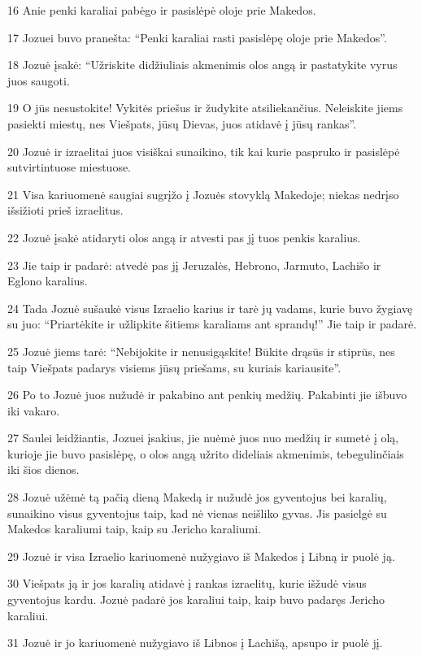 \par 16 Anie penki karaliai pabėgo ir pasislėpė oloje prie Makedos. 
\par 17 Jozuei buvo pranešta: “Penki karaliai rasti pasislėpę oloje prie Makedos”. 
\par 18 Jozuė įsakė: “Užriskite didžiuliais akmenimis olos angą ir pastatykite vyrus juos saugoti. 
\par 19 O jūs nesustokite! Vykitės priešus ir žudykite atsiliekančius. Neleiskite jiems pasiekti miestų, nes Viešpats, jūsų Dievas, juos atidavė į jūsų rankas”. 
\par 20 Jozuė ir izraelitai juos visiškai sunaikino, tik kai kurie paspruko ir pasislėpė sutvirtintuose miestuose. 
\par 21 Visa kariuomenė saugiai sugrįžo į Jozuės stovyklą Makedoje; niekas nedrįso išsižioti prieš izraelitus. 
\par 22 Jozuė įsakė atidaryti olos angą ir atvesti pas jį tuos penkis karalius. 
\par 23 Jie taip ir padarė: atvedė pas jį Jeruzalės, Hebrono, Jarmuto, Lachišo ir Eglono karalius. 
\par 24 Tada Jozuė sušaukė visus Izraelio karius ir tarė jų vadams, kurie buvo žygiavę su juo: “Priartėkite ir užlipkite šitiems karaliams ant sprandų!” Jie taip ir padarė. 
\par 25 Jozuė jiems tarė: “Nebijokite ir nenusigąskite! Būkite drąsūs ir stiprūs, nes taip Viešpats padarys visiems jūsų priešams, su kuriais kariausite”. 
\par 26 Po to Jozuė juos nužudė ir pakabino ant penkių medžių. Pakabinti jie išbuvo iki vakaro. 
\par 27 Saulei leidžiantis, Jozuei įsakius, jie nuėmė juos nuo medžių ir sumetė į olą, kurioje jie buvo pasislėpę, o olos angą užrito dideliais akmenimis, tebegulinčiais iki šios dienos. 
\par 28 Jozuė užėmė tą pačią dieną Makedą ir nužudė jos gyventojus bei karalių, sunaikino visus gyventojus taip, kad nė vienas neišliko gyvas. Jis pasielgė su Makedos karaliumi taip, kaip su Jericho karaliumi. 
\par 29 Jozuė ir visa Izraelio kariuomenė nužygiavo iš Makedos į Libną ir puolė ją. 
\par 30 Viešpats ją ir jos karalių atidavė į rankas izraelitų, kurie išžudė visus gyventojus kardu. Jozuė padarė jos karaliui taip, kaip buvo padaręs Jericho karaliui. 
\par 31 Jozuė ir jo kariuomenė nužygiavo iš Libnos į Lachišą, apsupo ir puolė jį. 
